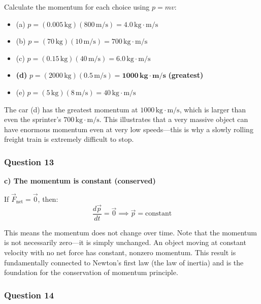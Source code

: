 \documentclass[12pt,letterpaper]{article}
\begin{document}
\begin{explanationbox}
Calculate the momentum for each choice using $p = mv$:
\begin{itemize}
    \item (a) $p = (0.005\,\text{kg})(800\,\text{m/s}) = 4.0\,\text{kg}\cdot\text{m/s}$
    \item (b) $p = (70\,\text{kg})(10\,\text{m/s}) = 700\,\text{kg}\cdot\text{m/s}$
    \item (c) $p = (0.15\,\text{kg})(40\,\text{m/s}) = 6.0\,\text{kg}\cdot\text{m/s}$
    \item \textbf{(d)} $p = (2000\,\text{kg})(0.5\,\text{m/s}) = \mathbf{1000\,\text{kg}\cdot\text{m/s}}$ \quad \textbf{(greatest)}
    \item (e) $p = (5\,\text{kg})(8\,\text{m/s}) = 40\,\text{kg}\cdot\text{m/s}$
\end{itemize}

The car (d) has the greatest momentum at $1000\,\text{kg}\cdot\text{m/s}$, which is larger than even the sprinter's $700\,\text{kg}\cdot\text{m/s}$. This illustrates that a very massive object can have enormous momentum even at very low speeds---this is why a slowly rolling freight train is extremely difficult to stop.
\end{explanationbox}

\subsubsection*{Question 13}

\begin{answerbox}
\textbf{c) The momentum is constant (conserved)}
\end{answerbox}

\begin{explanationbox}
If $\vec{F}_{\text{net}} = \vec{0}$, then:
\[
\frac{d\vec{p}}{dt} = \vec{0} \implies \vec{p} = \text{constant}
\]

This means the momentum does not change over time. Note that the momentum is not necessarily zero---it is simply unchanged. An object moving at constant velocity with no net force has constant, nonzero momentum. This result is fundamentally connected to Newton's first law (the law of inertia) and is the foundation for the conservation of momentum principle.
\end{explanationbox}

\subsubsection*{Question 14}
\end{document}
